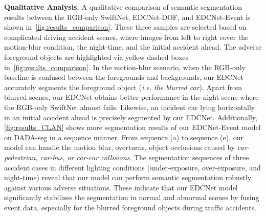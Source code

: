 \documentclass[journal]{IEEEtran}
\begin{document}
\textbf{Qualitative Analysis.}
A qualitative comparison of semantic segmentation results between the RGB-only SwiftNet, EDCNet-DOF, and EDCNet-Event is shown in~\cref{fig:results_comparison}. {These three samples are selected based on complicated driving accident scenes, where images from left to right cover the motion-blur condition, the night-time, and the initial accident ahead. The adverse foreground objects are highlighted via yellow dashed boxes in~\cref{fig:results_comparison}. In the motion-blur scenario, when the RGB-only baseline is confused between the foregrounds and backgrounds, our EDCNet accurately segments the foreground object (\textit{i.e.} \emph{the blurred car}). Apart from blurred scenes, our EDCNet obtains better performance in the night scene where the RGB-only SwiftNet almost fails. Likewise, an incident car lying horizontally in an initial accident ahead is precisely segmented by our EDCNet.
Additionally, \cref{fig:results_CLAN} shows more segmentation results of our EDCNet-Event model on DADA-seg in a sequence manner. From sequence (a) to sequence (e), our model can handle the motion blur, overturns, object occlusions caused by \emph{car-pedestrian, car-bus, or car-car collisions}. The segmentation sequences of three accident cases in different lighting conditions (under-exposure, over-exposure, and night-time) reveal that our model can perform semantic segmentation robustly against various adverse situations.} 
These indicate that our EDCNet model significantly stabilizes the segmentation in normal and abnormal scenes by fusing event data, especially for the blurred foreground objects during traffic accidents.


\end{document}
